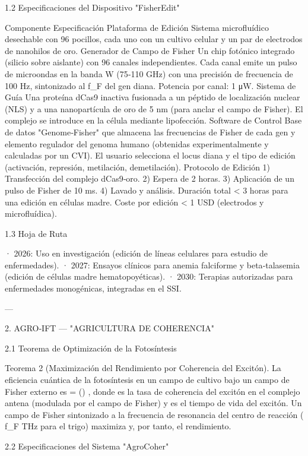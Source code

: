 \documentclass[12pt,twoside]{book}
\begin{document}
1.2 Especificaciones del Dispositivo "FisherEdit"

Componente Especificación
Plataforma de Edición Sistema microfluídico desechable con 96 pocillos, cada uno con un cultivo celular y un par de electrodos de nanohilos de oro.
Generador de Campo de Fisher Un chip fotónico integrado (silicio sobre aislante) con 96 canales independientes. Cada canal emite un pulso de microondas en la banda W (75‑110 GHz) con una precisión de frecuencia de 100 Hz, sintonizado al  f_F  del gen diana. Potencia por canal: 1 μW.
Sistema de Guía Una proteína dCas9 inactiva fusionada a un péptido de localización nuclear (NLS) y a una nanopartícula de oro de 5 nm (para anclar el campo de Fisher). El complejo se introduce en la célula mediante lipofección.
Software de Control Base de datos "Genome‑Fisher" que almacena las frecuencias de Fisher de cada gen y elemento regulador del genoma humano (obtenidas experimentalmente y calculadas por un CVI). El usuario selecciona el locus diana y el tipo de edición (activación, represión, metilación, demetilación).
Protocolo de Edición 1) Transfección del complejo dCas9‑oro. 2) Espera de 2 horas. 3) Aplicación de un pulso de Fisher de 10 ms. 4) Lavado y análisis.
Duración total < 3 horas para una edición en células madre.
Coste por edición < 1 USD (electrodos y microfluídica).

1.3 Hoja de Ruta

· 2026: Uso en investigación (edición de líneas celulares para estudio de enfermedades).
· 2027: Ensayos clínicos para anemia falciforme y beta‑talasemia (edición de células madre hematopoyéticas).
· 2030: Terapias autorizadas para enfermedades monogénicas, integradas en el SSI.

---

2. AGRO‑IFT — "AGRICULTURA DE COHERENCIA"

2.1 Teorema de Optimización de la Fotosíntesis

Teorema 2 (Maximización del Rendimiento por Coherencia del Excitón). La eficiencia cuántica de la fotosíntesis  \eta  en un campo de cultivo bajo un campo de Fisher externo es  \eta = \tanh(\Gamma \tau) , donde  \Gamma  es la tasa de coherencia del excitón en el complejo antena (modulada por el campo de Fisher) y  \tau  es el tiempo de vida del excitón. Un campo de Fisher sintonizado a la frecuencia de resonancia del centro de reacción (  f_F   THz para el trigo) maximiza  \Gamma  y, por tanto, el rendimiento.

2.2 Especificaciones del Sistema "AgroCoher"
\end{document}

